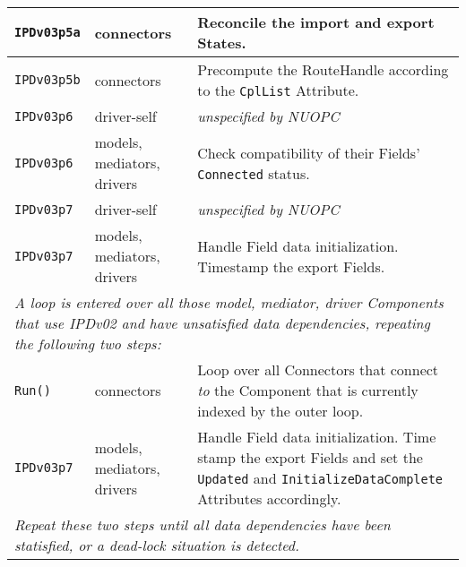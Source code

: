 \begin{longtable}[h]{|p{35mm}|p{4cm}|p{6cm}|}
     {\tt IPDv03p5a}& connectors                  & Reconcile the import and export States.\\ \hline
     {\tt IPDv03p5b}& connectors                  & Precompute the RouteHandle according to the {\tt CplList} Attribute.\\ \hline
     {\tt IPDv03p6} & driver-self                 & {\em unspecified by NUOPC}\\ \hline
     {\tt IPDv03p6} & models, mediators, drivers  & Check compatibility of their Fields' {\tt Connected} status.\\ \hline
     {\tt IPDv03p7} & driver-self                 & {\em unspecified by NUOPC}\\ \hline
     {\tt IPDv03p7} & models, mediators, drivers  & Handle Field data initialization. Timestamp the export Fields.\\ \hline
     \multicolumn{3}{|p{13.5cm}|}{\it A loop is entered over all those model, mediator, driver Components that use IPDv02 and have
     unsatisfied data dependencies, repeating the following two steps:}\\ \hline
     {\tt Run()}    & connectors                  & Loop over all Connectors that connect {\it to} the Component that is currently indexed by the outer loop.\\ \hline
     {\tt IPDv03p7} & models, mediators, drivers  & Handle Field data initialization. Time stamp the export Fields and set the {\tt Updated} and {\tt InitializeDataComplete} Attributes accordingly.\\ \hline
     \multicolumn{3}{|p{13.5cm}|}{\it Repeat these two steps until all data
     dependencies have been statisfied, or a dead-lock situation is detected.}\\ 
     \hline\hline
\end{longtable}

